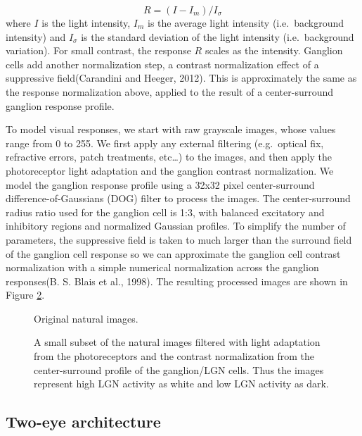 \documentclass[
  onecolumn]{article}
\begin{document}
\[
R = (I-I_m)/I_\sigma
\] where \(I\) is the light intensity, \(I_m\) is the average light
intensity (i.e.~background intensity) and \(I_\sigma\) is the standard
deviation of the light intensity (i.e.~background variation). For small
contrast, the response \(R\) scales as the intensity. Ganglion cells add
another normalization step, a contrast normalization effect of a
suppressive field(Carandini and Heeger, 2012). This is approximately the
same as the response normalization above, applied to the result of a
center-surround ganglion response profile.

To model visual responses, we start with raw grayscale images, whose
values range from 0 to 255. We first apply any external filtering
(e.g.~optical fix, refractive errors, patch treatments, etc\ldots) to
the images, and then apply the photoreceptor light adaptation and the
ganglion contrast normalization. We model the ganglion response profile
using a 32x32 pixel center-surround difference-of-Gaussians (DOG) filter
to process the images. The center-surround radius ratio used for the
ganglion cell is 1:3, with balanced excitatory and inhibitory regions
and normalized Gaussian profiles. To simplify the number of parameters,
the suppressive field is taken to much larger than the surround field of
the ganglion cell response so we can approximate the ganglion cell
contrast normalization with a simple numerical normalization across the
ganglion responses(B. S. Blais et al., 1998). The resulting processed
images are shown in Figure \ref{fig:LGNresponses}.

\begin{figure}
\hypertarget{fig:orig}{%
\centering

\caption{Original natural images.}\label{fig:orig}
}
\end{figure}

\begin{figure}
\hypertarget{fig:LGNresponses}{%
\centering

\caption{A small subset of the natural images filtered with light
adaptation from the photoreceptors and the contrast normalization from
the center-surround profile of the ganglion/LGN cells. Thus the images
represent high LGN activity as white and low LGN activity as
dark.}\label{fig:LGNresponses}
}
\end{figure}

\hypertarget{two-eye-architecture}{%
\subsection{Two-eye architecture}\label{two-eye-architecture}}
\end{document}
